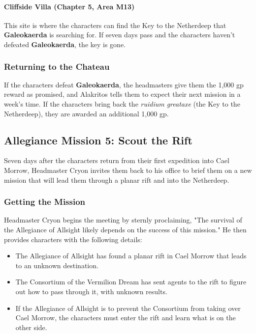 \documentclass[letterpaper, 11pt, bg=full, twocolumn]{dndbook}
\begin{document}
\paragraph{Cliffside Villa (Chapter 5, Area M13)}

This site is where the characters can find the Key to the Netherdeep that \textbf{Galeokaerda} is searching for. If seven days pass and the characters haven't defeated \textbf{Galeokaerda}, the key is gone.

\subsubsection{Returning to the Chateau}

If the characters defeat \textbf{Galeokaerda}, the headmasters give them the 1,000 gp reward as promised, and Alakritos tells them to expect their next mission in a week's time. If the characters bring back the \textit{ruidium greataxe} (the Key to the Netherdeep), they are awarded an additional 1,000 gp.

\subsection{Allegiance Mission 5: Scout the Rift}

Seven days after the characters return from their first expedition into Cael Morrow, Headmaster Cryon invites them back to his office to brief them on a new mission that will lead them through a planar rift and into the Netherdeep.

\subsubsection{Getting the Mission}

Headmaster Cryon begins the meeting by sternly proclaiming, "The survival of the Allegiance of Allsight likely depends on the success of this mission." He then provides characters with the following details:

\begin{itemize}
\item The Allegiance of Allsight has found a planar rift in Cael Morrow that leads to an unknown destination.
\item The Consortium of the Vermilion Dream has sent agents to the rift to figure out how to pass through it, with unknown results.
\item If the Allegiance of Allsight is to prevent the Consortium from taking over Cael Morrow, the characters must enter the rift and learn what is on the other side.
\end{itemize}
\end{document}
